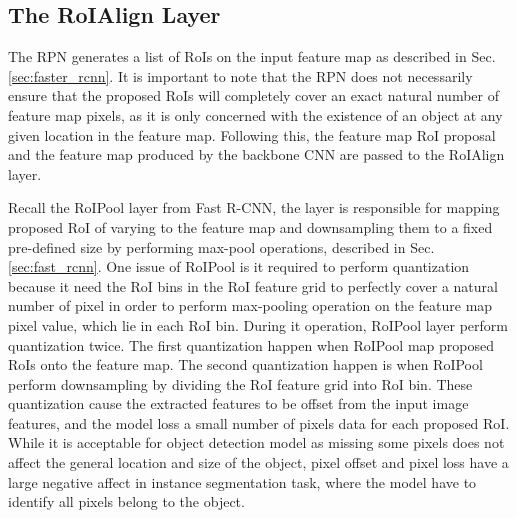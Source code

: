 \subsection{The RoIAlign Layer}

The RPN generates a list of RoIs on the input feature map as described in Sec. \ref{sec:faster_rcnn}. It is important to note that the RPN does not necessarily ensure that the proposed RoIs will completely cover an exact natural number of feature map pixels, as it is only concerned with the existence of an object at any given location in the feature map. Following this, the feature map RoI proposal and the feature map produced by the backbone CNN are passed to the RoIAlign layer. 

Recall the RoIPool layer from Fast R-CNN, the layer is responsible for mapping proposed RoI of varying to the feature map and downsampling them to a fixed pre-defined size by performing max-pool operations, described in Sec. \ref{sec:fast_rcnn}. One issue of RoIPool is it required to perform quantization because it need the RoI bins in the RoI feature grid to perfectly cover a natural number of pixel in order to perform max-pooling operation on the feature map pixel value, which lie in each RoI bin. During it operation, RoIPool layer perform quantization twice. The first quantization happen when RoIPool map proposed RoIs onto the feature map. The second quantization happen is when RoIPool perform downsampling by dividing the RoI feature grid into RoI bin. These quantization cause the extracted features to be offset from the input image features, and the model loss a small number of pixels data for each proposed RoI. While it is acceptable for object detection model as missing some pixels does not affect the general location and size of the object, pixel offset and pixel loss have a large negative affect in instance segmentation task, where the model have to identify all pixels belong to the object.

